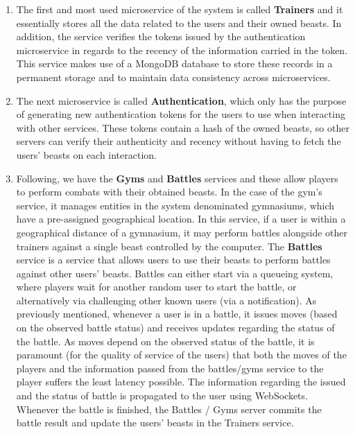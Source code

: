 \begin{enumerate}
    \item The first and most used microservice of the system is called \textbf{Trainers} and it essentially stores all the data related to the users and their owned beasts. In addition, the service verifies the tokens issued by the authentication microservice in regards to the recency of the information carried in the token. This service makes use of a MongoDB  database to store these records in a permanent storage and to maintain data consistency across microservices.
    
    \item The next microservice is called \textbf{Authentication}, which only has the purpose of generating new authentication tokens for the users to use when interacting with other services. These tokens contain a hash of the owned beasts, so other servers can verify their authenticity and recency without having to fetch the users' beasts on each interaction.

    \item Following, we have the \textbf{Gyms} and \textbf{Battles} services and these allow players to perform combats with their obtained beasts. In the case of the gym's service, it manages entities in the system denominated gymnasiums, which have a pre-assigned geographical location. In this service, if a user is within a geographical distance of a gymnasium, it may perform battles alongside other trainers against a single beast controlled by the computer. The \textbf{Battles} service is a service that allows users to use their beasts to perform battles against other users' beasts. Battles can either start via a queueing system, where players wait for another random user to start the battle, or alternatively via challenging other known users (via a notification). As previously mentioned, whenever a user is in a battle, it issues moves (based on the observed battle status) and receives updates regarding the status of the battle. As moves depend on the observed status of the battle, it is paramount (for the quality of service of the users) that both the moves of the players and the information passed from the battles/gyms service to the player suffers the least latency possible. The information regarding the issued and the status of battle is propagated to the user using WebSockets. Whenever the battle is finished, the Battles / Gyms server commits the battle result and update the users' beasts in the Trainers service.
    

\end{enumerate}
